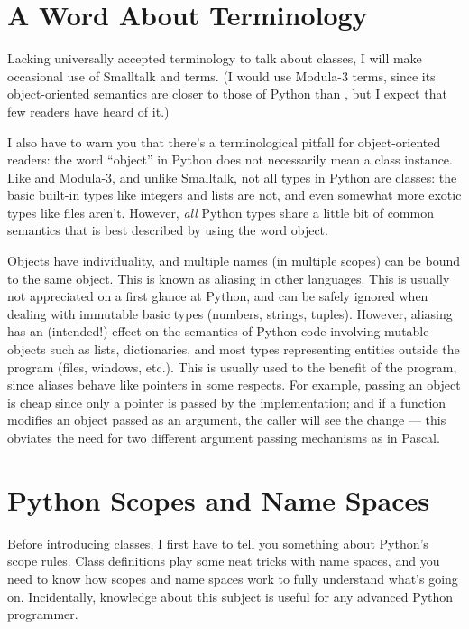 \documentclass{manual}
\begin{document}
\section{A Word About Terminology}
\label{terminology}

Lacking universally accepted terminology to talk about classes, I will
make occasional use of Smalltalk and \Cpp{} terms.  (I would use Modula-3
terms, since its object-oriented semantics are closer to those of
Python than \Cpp{}, but I expect that few readers have heard of it.)

I also have to warn you that there's a terminological pitfall for
object-oriented readers: the word ``object'' in Python does not
necessarily mean a class instance.  Like \Cpp{} and Modula-3, and
unlike Smalltalk, not all types in Python are classes: the basic
built-in types like integers and lists are not, and even somewhat more
exotic types like files aren't.  However, \emph{all} Python types
share a little bit of common semantics that is best described by using
the word object.

Objects have individuality, and multiple names (in multiple scopes)
can be bound to the same object.  This is known as aliasing in other
languages.  This is usually not appreciated on a first glance at
Python, and can be safely ignored when dealing with immutable basic
types (numbers, strings, tuples).  However, aliasing has an
(intended!) effect on the semantics of Python code involving mutable
objects such as lists, dictionaries, and most types representing
entities outside the program (files, windows, etc.).  This is usually
used to the benefit of the program, since aliases behave like pointers
in some respects.  For example, passing an object is cheap since only
a pointer is passed by the implementation; and if a function modifies
an object passed as an argument, the caller will see the change --- this
obviates the need for two different argument passing mechanisms as in
Pascal.


\section{Python Scopes and Name Spaces}
\label{scopes}

Before introducing classes, I first have to tell you something about
Python's scope rules.  Class definitions play some neat tricks with
name spaces, and you need to know how scopes and name spaces work to
fully understand what's going on.  Incidentally, knowledge about this
subject is useful for any advanced Python programmer.
\end{document}
